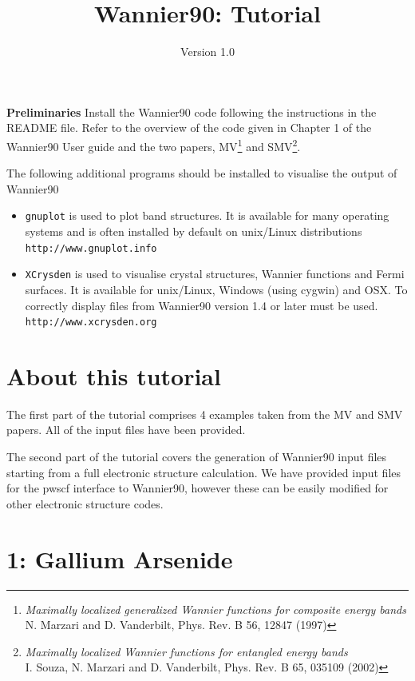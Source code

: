 \documentclass[a4paper,11pt,twoside]{article}
\title{Wannier90: Tutorial}
\author{Version 1.0}
\begin{document}
\maketitle

{\bf Preliminaries}
Install the Wannier90 code following the instructions in the README file.
Refer to the overview of the code given in Chapter 1 of the Wannier90 User guide
and the two papers, MV\footnote{{\it Maximally localized generalized
    Wannier functions for composite energy bands}\\ N. Marzari and
  D. Vanderbilt, Phys. Rev. B 56, 12847 (1997)} 
 and SMV\footnote{{\it Maximally localized Wannier functions for entangled energy bands}\\
I. Souza, N. Marzari and D. Vanderbilt, Phys. Rev. B 65, 035109 (2002)}.


The following additional programs should be installed to visualise the output of Wannier90
\begin{itemize}
\item {\tt gnuplot} is used to plot band structures. It is 
available for many operating systems and is often installed by default on
 unix/Linux distributions\\
{\tt http://www.gnuplot.info}
\item {\tt XCrysden} is used to visualise crystal structures, Wannier functions and Fermi
surfaces. It is available for unix/Linux, Windows (using cygwin) and OSX. To correctly display
files from Wannier90 version 1.4 or later must be used.\\
{\tt http://www.xcrysden.org}
\end{itemize}



\section*{About this tutorial}

The first part of the tutorial comprises 4 examples taken from the MV and SMV papers.
All of the input files have been provided.

The second part of the tutorial covers the generation of Wannier90 input files
starting from a full electronic structure calculation. We have provided input files for the pwscf
interface to Wannier90, however these can be easily modified for other electronic structure
codes.

\cleardoublepage

\section*{1: Gallium Arsenide}
\end{document}
